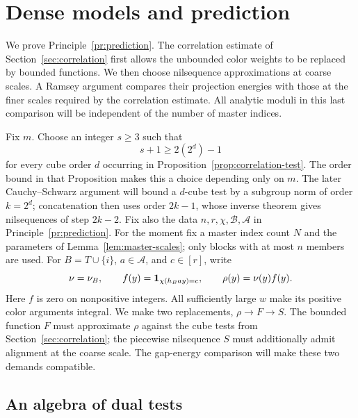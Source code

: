 \section{Dense models and prediction}\label{sec:prediction}

We prove Principle~\ref{pr:prediction}.  The correlation estimate of
Section~\ref{sec:correlation} first allows the unbounded color weights to be
replaced by bounded functions.  We then choose nilsequence approximations at
coarse scales.  A Ramsey argument compares their projection energies with
those at the finer scales required by the correlation estimate.  All analytic
moduli in this last comparison will be independent of the number of master
indices.

Fix $m$.  Choose an integer $s\geq3$ such that
\begin{equation}\label{eq:prediction-step-choice}
 s+1\geq 2(2^d)-1
\end{equation}
for every cube order $d$ occurring in Proposition~\ref{prop:correlation-test}.
The order bound in that Proposition makes this a choice depending only on
$m$.  The later Cauchy--Schwarz argument will bound a $d$-cube test
by a subgroup norm of order $k=2^d$; concatenation then uses order
$2k-1$, whose inverse theorem gives
nilsequences of step $2k-2$.
Fix also the data $n,r,\chi,\mathcal B,\mathcal A$ in
Principle~\ref{pr:prediction}.  For the moment fix a master index count
$N$ and the parameters of Lemma~\ref{lem:master-scales}; only blocks
with at most $n$ members are used.
For $B=T\cup\{i\}$, $a\in\mathcal A$, and $c\in[r]$, write
\[
 \nu=\nu_B,\qquad f(y)=\mathbf 1_{\chi(h_Bay)=c},\qquad \rho(y)=\nu(y)f(y).
\]
Here $f$ is zero on nonpositive integers.  All sufficiently large $w$ make
its positive color arguments integral.  We make two replacements,
$\rho\to F\to S$.  The bounded function
$F$ must approximate $\rho$ against the cube tests from
Section~\ref{sec:correlation};
the piecewise nilsequence $S$ must additionally admit alignment at the
coarse scale.  The gap-energy comparison will make these two demands
compatible.

\subsection{An algebra of dual tests}

